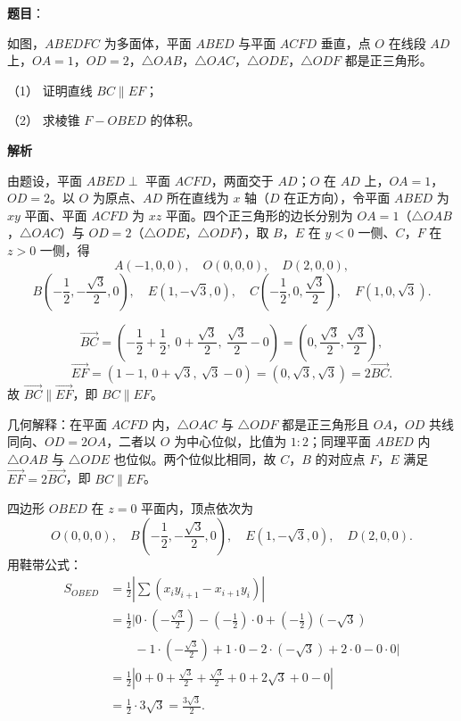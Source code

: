 \begin{answer}

\textbf{题目}：

如图，$ABEDFC$ 为多面体，平面 $ABED$ 与平面 $ACFD$ 垂直，点 $O$ 在线段 $AD$ 上，$OA=1$，$OD=2$，$\triangle OAB$，$\triangle OAC$，$\triangle ODE$，$\triangle ODF$ 都是正三角形。

（1） 证明直线 $BC\parallel EF$；

（2） 求棱锥 $F-OBED$ 的体积。
\nopagebreak[4]
\begin{center}\end{center}
\nopagebreak[4]
\textbf{解析}

由题设，平面 $ABED\perp$ 平面 $ACFD$，两面交于 $AD$；$O$ 在 $AD$ 上，$OA=1$，$OD=2$。以 $O$ 为原点、$AD$ 所在直线为 $x$ 轴（$D$ 在正方向），令平面 $ABED$ 为 $xy$ 平面、平面 $ACFD$ 为 $xz$ 平面。四个正三角形的边长分别为 $OA=1$（$\triangle OAB$，$\triangle OAC$）与 $OD=2$（$\triangle ODE$，$\triangle ODF$），取 $B$，$E$ 在 $y<0$ 一侧、$C$，$F$ 在 $z>0$ 一侧，得
\nopagebreak[4]
\[A(-1,0,0),\quad O(0,0,0),\quad D(2,0,0),\]
\nopagebreak[4]
\[B\left(-\frac12,-\frac{\sqrt3}{2},0\right),\quad E\left(1,-\sqrt3,0\right),\quad C\left(-\frac12,0,\frac{\sqrt3}{2}\right),\quad F\left(1,0,\sqrt3\right).\]

\nopagebreak[4]
\[\overrightarrow{BC}=\left(-\frac12+\frac12,\ 0+\frac{\sqrt3}{2},\ \frac{\sqrt3}{2}-0\right)=\left(0,\frac{\sqrt3}{2},\frac{\sqrt3}{2}\right),\]
\nopagebreak[4]
\[\overrightarrow{EF}=\left(1-1,\ 0+\sqrt3,\ \sqrt3-0\right)=\left(0,\sqrt3,\sqrt3\right)=2\overrightarrow{BC}.\]
故 $\overrightarrow{BC}\parallel\overrightarrow{EF}$，即 $BC\parallel EF$。

几何解释：在平面 $ACFD$ 内，$\triangle OAC$ 与 $\triangle ODF$ 都是正三角形且 $OA$，$OD$ 共线同向、$OD=2OA$，二者以 $O$ 为中心位似，比值为 $1:2$；同理平面 $ABED$ 内 $\triangle OAB$ 与 $\triangle ODE$ 也位似。两个位似比相同，故 $C$，$B$ 的对应点 $F$，$E$ 满足 $\overrightarrow{EF}=2\overrightarrow{BC}$，即 $BC\parallel EF$。

四边形 $OBED$ 在 $z=0$ 平面内，顶点依次为
\nopagebreak[4]
\[O(0,0,0),\quad B\left(-\frac12,-\frac{\sqrt3}{2},0\right),\quad E\left(1,-\sqrt3,0\right),\quad D(2,0,0).\]
用鞋带公式：
\nopagebreak[4]
\[
\begin{aligned}
S_{OBED}&=\frac12\left|\sum\left(x_iy_{i+1}-x_{i+1}y_i\right)\right|\\
&=\frac12\Big|0\cdot\left(-\frac{\sqrt3}{2}\right)-\left(-\frac12\right)\cdot0+\left(-\frac12\right)(-\sqrt3)\\
&\qquad-1\cdot\left(-\frac{\sqrt3}{2}\right)+1\cdot0-2\cdot(-\sqrt3)+2\cdot0-0\cdot0\Big|\\
&=\frac12\left|0+0+\frac{\sqrt3}{2}+\frac{\sqrt3}{2}+0+2\sqrt3+0-0\right|\\
&=\frac12\cdot3\sqrt3=\frac{3\sqrt3}{2}.
\end{aligned}
\]


\end{answer}
